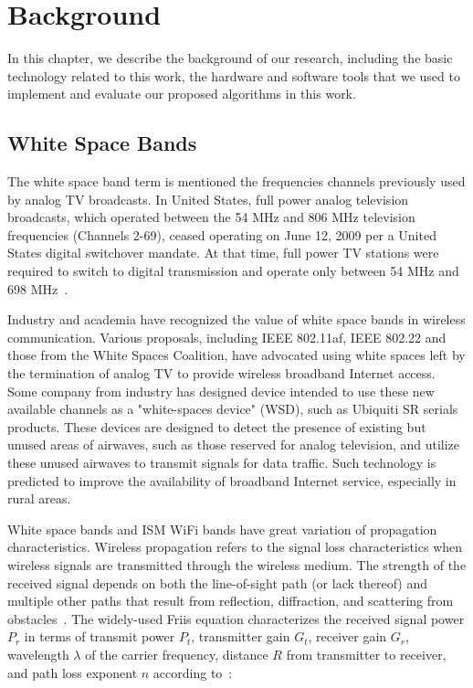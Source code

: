 \chapter{Background} 
\label{ch:background}

In this chapter, we describe the background of our research, including the basic 
technology related to this work, the hardware and software tools that we used to 
implement and evaluate our proposed algorithms in this work.


\section{White Space Bands}

The white space band term is mentioned the frequencies channels previously used by 
analog TV broadcasts. In United States, full power analog television broadcasts, 
which operated between the 54 MHz and 806 MHz television frequencies (Channels 2-69), 
ceased operating on June 12, 2009 per a United States digital switchover mandate. At 
that time, full power TV stations were required to switch to digital transmission and 
operate only between 54 MHz and 698 MHz~\cite{fccwhitespace}.

Industry and academia have recognized the value of white space bands in wireless 
communication. Various proposals, including IEEE 802.11af, IEEE 802.22 and those 
from the White Spaces Coalition, have advocated using white spaces left by the 
termination of analog TV to provide wireless broadband Internet access. Some company 
from industry has designed device intended to use these new available channels as a 
"white-spaces device" (WSD), such as Ubiquiti SR serials products. These devices are 
designed to detect the presence of existing but unused areas of airwaves, such as those 
reserved for analog television, and utilize these unused airwaves to transmit signals 
for data traffic. Such technology is predicted to improve the availability of broadband 
Internet service, especially in rural areas.

White space bands and ISM WiFi bands have great variation of propagation characteristics. 
Wireless propagation refers to the signal loss characteristics when wireless signals are 
transmitted through the wireless medium. The strength of the received signal depends on 
both the line-of-sight path (or lack thereof) and multiple other paths that result from 
reflection, diffraction, and scattering from obstacles~\cite{andersen1995propagation}. 
The widely-used Friis equation characterizes the received signal power $P_r$ in terms of 
transmit power $P_t$, transmitter gain $G_t$, receiver gain $G_r$, wavelength $\lambda$ 
of the carrier frequency, distance $R$ from transmitter to receiver, and path loss 
exponent $n$ according to~\cite{friis}:

